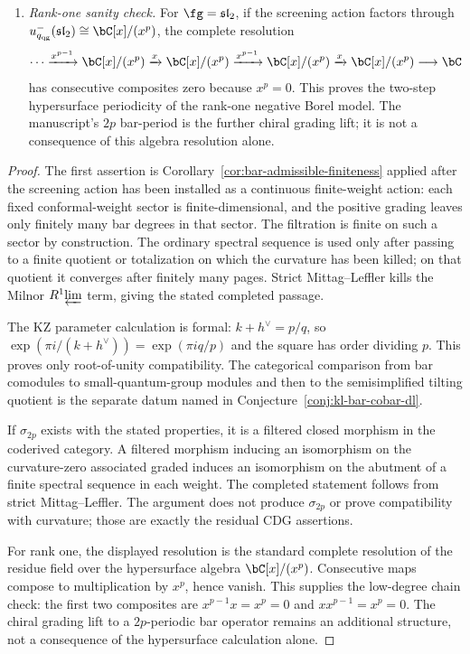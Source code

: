 \begin{theorem}
\begin{enumerate}[label=\textup{(\roman*)}]
 Conjecture~\ref{conj:periodic-cdg}; the obstruction is
 Massey-vanishing plus compatibility with curvature and
 deconcatenation.
\item \emph{Rank-one sanity check.}  For $\fg=\mathfrak{sl}_2$, if
 the screening action factors through
 $u_{q_{\mathrm{qg}}}^-(\mathfrak{sl}_2)\cong \bC[x]/(x^p)$, the
 complete resolution
 \[
 \cdots \xrightarrow{x^{p-1}} \bC[x]/(x^p)
 \xrightarrow{x} \bC[x]/(x^p)
 \xrightarrow{x^{p-1}} \bC[x]/(x^p)
 \xrightarrow{x} \bC[x]/(x^p)
 \longrightarrow \bC
 \]
 has consecutive composites zero because $x^p=0$.  This proves the
 two-step hypersurface periodicity of the rank-one negative Borel
 model.  The manuscript's $2p$ bar-period is the further chiral
 grading lift; it is not a consequence of this algebra resolution
 alone.
\end{enumerate}
\end{theorem}

\begin{proof}
The first assertion is Corollary~\ref{cor:bar-admissible-finiteness}
applied after the screening action has been installed as a continuous
finite-weight action:
each fixed conformal-weight sector is finite-dimensional, and the
positive grading leaves only finitely many bar degrees in that sector.
The filtration is finite on such a sector by construction.  The
ordinary spectral sequence is used only after passing to a finite
quotient or totalization on which the curvature has been killed; on
that quotient it converges after finitely many pages.  Strict
Mittag--Leffler kills the Milnor $R^1\!\varprojlim$ term, giving the
stated completed passage.

The KZ parameter calculation is formal:
$k+h^\vee=p/q$, so $\exp(\pi i/(k+h^\vee))=\exp(\pi i q/p)$ and the
square has order dividing $p$.  This proves only root-of-unity
compatibility.  The categorical comparison from bar comodules to
small-quantum-group modules and then to the semisimplified tilting
quotient is the separate datum named in
Conjecture~\ref{conj:kl-bar-cobar-dl}.

If $\sigma_{2p}$ exists with the stated properties, it is a filtered
closed morphism in the coderived category.  A filtered morphism
inducing an isomorphism on the curvature-zero associated graded
induces an isomorphism on the abutment of a finite spectral sequence
in each weight.  The completed statement follows from strict
Mittag--Leffler.  The argument does not produce $\sigma_{2p}$ or prove
compatibility with curvature; those are exactly the residual CDG
assertions.

For rank one, the displayed resolution is the standard complete
resolution of the residue field over the hypersurface algebra
\(\bC[x]/(x^p)\).  Consecutive maps compose to multiplication by
\(x^p\), hence vanish.  This supplies the low-degree chain check:
the first two composites are \(x^{p-1}x=x^p=0\) and
\(xx^{p-1}=x^p=0\).  The chiral grading lift to a \(2p\)-periodic
bar operator remains an additional structure, not a consequence of
the hypersurface calculation alone.
\end{proof}

